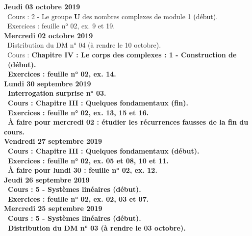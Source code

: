 \documentclass[12pt,a4paper]{article}
\begin{document}
\noindent\textbf{Jeudi 03 octobre 2019}\\
\bu\ Cours : 2 - Le groupe \textbf{U} des nombres complexes de module 1 (début).\\
 \bu\ Exercices : feuille n° 02, ex. 9 et 19.\vspace{.4cm}\\

\noindent\textbf{\bf Mercredi 02 octobre 2019}\\
\bu\ Distribution du DM n° 04 (à rendre le 10 octobre).\\
\bu\ Cours : \bf Chapitre IV \rm : Le corps des complexes : 1 - Construction de \C\ (début).\\
 \bu\ Exercices : feuille n° 02, ex. 14.\vspace{.4cm}\\

\noindent\textbf{\bf Lundi 30 septembre 2019}\\
 \bu\ Interrogation surprise n° 03.\\
 \bu\ Cours : \bf Chapitre III \rm : Quelques fondamentaux (fin).\\
 \bu\ Exercices : feuille n° 02, ex. 13, 15 et 16.\\
\bu\ À faire pour mercredi 02 : étudier les récurrences fausses de la fin du cours.\vspace{.4cm}\\

 \noindent\textbf{Vendredi 27 septembre 2019}\\
 \bu\ Cours : \bf Chapitre III \rm : Quelques fondamentaux (début).\\
 \bu\ Exercices : feuille n° 02, ex. 05 et 08, 10 et 11.\\
 \bu\ À faire pour lundi 30 : feuille n° 02, ex. 12.\vspace{.4cm}\\
 
 \noindent\textbf{Jeudi 26 septembre 2019}\\
 \bu\ Cours : 5 - Systèmes linéaires (début).\\
 \bu\ Exercices : feuille n° 02, ex. 02, 03 et 07.\vspace{.4cm}\\
 
 \noindent\textbf{\bf Mercredi 25 septembre 2019}\\
 \bu\ Cours : 5 - Systèmes linéaires (début).\\
 \bu\ Distribution du DM n° 03 (à rendre le 03 octobre).\\
 
\end{document}
